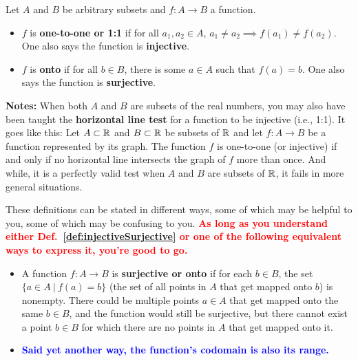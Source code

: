 \begin{tcolorbox}[colback=mylightblue, title = {\bf More Function Vocabulary}, breakable]

\begin{definition} 
\label{def:injectiveSurjective}
Let $A$ and $B$ be arbitrary subsets and $f:A \to B$ a function. 
\begin{itemize}
    \item $f$ is \textbf{one-to-one or 1:1} if for all $a_1, a_2 \in A$, $a_1 \neq a_2 \implies f(a_1) \neq f(a_2)$.  One also says the function is \textbf{injective}.

    \item  $f$ is \textbf{onto} if for all $b \in B$, there is some $a\in A$ such that $f(a) = b$.   One also says the function is \textbf{surjective}.
\end{itemize}
\end{definition} 

\textbf{Notes:} When both $A$ and $B$ are subsets of the real numbers, you may also have been taught the \textbf{horizontal line test} for a function to be injective (i.e., 1:1). It goes like this: Let $A \subset \mathbb R$ and $B \subset \mathbb R$ be subsets of $\mathbb R$ and let $f: A \to B$ be a function represented by its graph. The function $f$ is one-to-one (or injective) if and only if no horizontal line intersects the graph of $f$ more than once. And while, it is a perfectly valid test when $A$ and $B$ are subsets of $\mathbb R$, it fails in more general situations. \\


\end{tcolorbox}

These definitions can be stated in different ways, some of which may be helpful to you, some of which may be confusing to you. \textcolor{red}{\bf As long as you understand either Def.~\ref{def:injectiveSurjective} or one of the following equivalent ways to express it, you're good to go.} 
\begin{itemize}
    \item A function $f:A \to B$ is \textbf{surjective or onto} if for each $b\in B$, the set $\{ a\in A~ | ~ f(a) = b\}$ (the set of all points in $A$ that get mapped onto $b$) is nonempty. There could be multiple points $a\in A$ that get mapped onto the same $b\in B$, and the function would still be surjective, but there cannot exist a point $b\in B$ for which there are no points in $A$ that get mapped onto it. 
    \item \textcolor{blue}{\bf Said yet another way, the function's codomain is also its range.}
\end{itemize}

